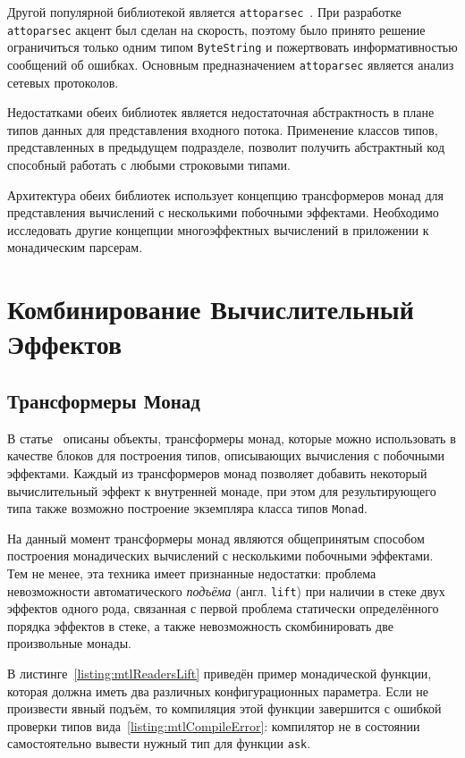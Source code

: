 Другой популярной библиотекой является 
\lstinline{attoparsec}~\autocite{Attoparsec}. При разработке 
\lstinline{attoparsec} акцент был сделан на скорость, поэтому было принято 
решение ограничиться только одним типом \lstinline{ByteString} и пожертвовать 
информативностью сообщений об ошибках. Основным предназначением 
\lstinline{attoparsec} является анализ сетевых протоколов.

Недостатками обеих библиотек является недостаточная абстрактность в плане типов
данных для представления входного потока. Применение классов типов, 
представленных в предыдущем подразделе, позволит получить абстрактный код 
способный работать с любыми строковыми типами.

Архитектура обеих библиотек использует концепцию трансформеров монад для 
представления вычислений с несколькими побочными эффектами. Необходимо 
исследовать другие концепции многоэффектных вычислений в приложении к 
монадическим парсерам.

\chapter{Комбинирование Вычислительный Эффектов}

\section{Трансформеры Монад}

В статье~\autocite{MonadTransformers} описаны объекты, трансформеры монад, 
которые можно использовать в качестве блоков для построения типов, описывающих 
вычисления с побочными эффектами. Каждый из трансформеров монад позволяет 
добавить некоторый вычислительный эффект к внутренней монаде, при 
этом для результирующего типа также возможно построение экземпляра класса 
типов \lstinline{Monad}.

На данный момент трансформеры монад являются общепринятым способом построения 
монадических вычислений с несколькими побочными эффектами. Тем не менее, эта 
техника имеет признанные недостатки: проблема невозможности автоматического 
\emph{подъёма} (англ. \lstinline{lift}) при наличии в стеке двух эффектов одного
рода, связанная с первой проблема статически определённого порядка эффектов в 
стеке, а также невозможность скомбинировать две произвольные монады.

В листинге~\ref{listing:mtlReadersLift} приведён пример монадической функции, 
которая должна иметь два различных конфигурационных параметра. Если не 
произвести явный подъём, то компиляция этой функции завершится с ошибкой 
проверки типов вида~\ref{listing:mtlCompileError}: компилятор не в состоянии 
самостоятельно вывести нужный тип для функции \lstinline{ask}.

